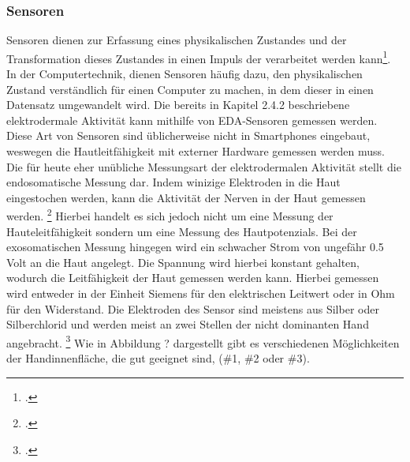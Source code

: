 \subsubsection{Sensoren}
Sensoren dienen zur Erfassung eines physikalischen Zustandes und der Transformation dieses Zustandes in einen Impuls der verarbeitet werden kann\footcite[Vgl.][]{Web18}. In der Computertechnik, dienen Sensoren häufig dazu, den physikalischen Zustand verständlich für einen Computer zu machen, in dem dieser in einen Datensatz umgewandelt wird. \newline 
Die bereits in Kapitel 2.4.2 beschriebene elektrodermale Aktivität kann mithilfe von EDA-Sensoren gemessen werden. Diese Art von Sensoren sind üblicherweise nicht in Smartphones eingebaut, weswegen die Hautleitfähigkeit mit externer Hardware gemessen werden muss. \newline
Die für heute eher unübliche Messungsart der elektrodermalen Aktivität stellt die endosomatische Messung dar. Indem winizige Elektroden in die Haut eingestochen werden, kann die Aktivität der Nerven in der Haut gemessen werden. \footcite[Vgl.][Folie 25]{Sch12} Hierbei handelt es sich jedoch nicht um eine Messung der Hauteleitfähigkeit sondern um eine Messung des Hautpotenzials. \newline
Bei der exosomatischen Messung hingegen wird ein schwacher Strom von ungefähr 0.5 Volt an die Haut angelegt. Die Spannung wird hierbei konstant gehalten, wodurch die Leitfähigkeit der Haut gemessen werden kann. Hierbei gemessen wird entweder in der Einheit Siemens für den elektrischen Leitwert oder in Ohm für den Widerstand. Die Elektroden des Sensor sind meistens aus Silber oder Silberchlorid und werden meist an zwei Stellen der nicht dominanten Hand angebracht. \footcite[Vgl.][Folie 25]{Sch12} Wie in Abbildung ? dargestellt gibt es verschiedenen Möglichkeiten der Handinnenfläche, die gut geeignet sind, (\#1, \#2 oder \#3). \newline 
